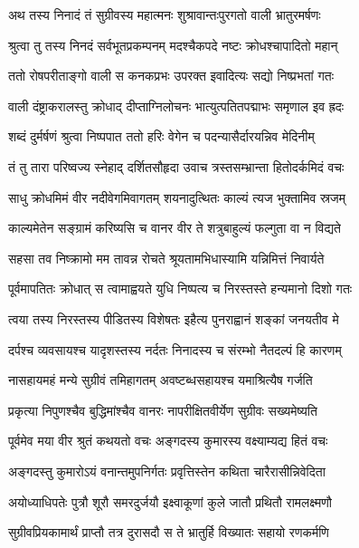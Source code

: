 
\twolineshloka
{अथ तस्य निनादं तं सुग्रीवस्य महात्मनः}
{शुश्रावान्तःपुरगतो वाली भ्रातुरमर्षणः} %

\twolineshloka
{श्रुत्वा तु तस्य निनदं सर्वभूतप्रकम्पनम्}
{मदश्चैकपदे नष्टः क्रोधश्चापादितो महान्} %

\twolineshloka
{ततो रोषपरीताङ्गो वाली स कनकप्रभः}
{उपरक्त इवादित्यः सद्यो निष्प्रभतां गतः} %

\twolineshloka
{वाली दंष्ट्राकरालस्तु क्रोधाद् दीप्ताग्निलोचनः}
{भात्युत्पतितपद्माभः समृणाल इव ह्रदः} %

\twolineshloka
{शब्दं दुर्मर्षणं श्रुत्वा निष्पपात ततो हरिः}
{वेगेन च पदन्यासैर्दारयन्निव मेदिनीम्} %

\twolineshloka
{तं तु तारा परिष्वज्य स्नेहाद् दर्शितसौहृदा}
{उवाच त्रस्तसम्भ्रान्ता हितोदर्कमिदं वचः} %

\twolineshloka
{साधु क्रोधमिमं वीर नदीवेगमिवागतम्}
{शयनादुत्थितः काल्यं त्यज भुक्तामिव स्रजम्} %

\twolineshloka
{काल्यमेतेन सङ्ग्रामं करिष्यसि च वानर}
{वीर ते शत्रुबाहुल्यं फल्गुता वा न विद्यते} %

\twolineshloka
{सहसा तव निष्क्रामो मम तावन्न रोचते}
{श्रूयतामभिधास्यामि यन्निमित्तं निवार्यते} %

\twolineshloka
{पूर्वमापतितः क्रोधात् स त्वामाह्वयते युधि}
{निष्पत्य च निरस्तस्ते हन्यमानो दिशो गतः} %

\twolineshloka
{त्वया तस्य निरस्तस्य पीडितस्य विशेषतः}
{इहैत्य पुनराह्वानं शङ्कां जनयतीव मे} %

\twolineshloka
{दर्पश्च व्यवसायश्च यादृशस्तस्य नर्दतः}
{निनादस्य च संरम्भो नैतदल्पं हि कारणम्} %

\twolineshloka
{नासहायमहं मन्ये सुग्रीवं तमिहागतम्}
{अवष्टब्धसहायश्च यमाश्रित्यैष गर्जति} %

\twolineshloka
{प्रकृत्या निपुणश्चैव बुद्धिमांश्चैव वानरः}
{नापरीक्षितवीर्येण सुग्रीवः सख्यमेष्यति} %

\twolineshloka
{पूर्वमेव मया वीर श्रुतं कथयतो वचः}
{अङ्गदस्य कुमारस्य वक्ष्याम्यद्य हितं वचः} %

\twolineshloka
{अङ्गदस्तु कुमारोऽयं वनान्तमुपनिर्गतः}
{प्रवृत्तिस्तेन कथिता चारैरासीन्निवेदिता} %

\twolineshloka
{अयोध्याधिपतेः पुत्रौ शूरौ समरदुर्जयौ}
{इक्ष्वाकूणां कुले जातौ प्रथितौ रामलक्ष्मणौ} %

\twolineshloka
{सुग्रीवप्रियकामार्थं प्राप्तौ तत्र दुरासदौ}
{स ते भ्रातुर्हि विख्यातः सहायो रणकर्मणि} %

